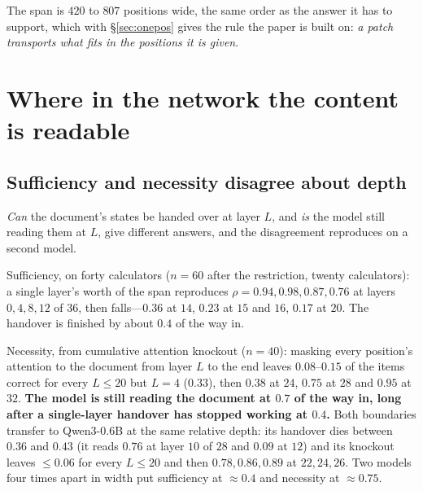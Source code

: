 \documentclass{article}
\begin{document}
\begin{table}[t]
\caption{The span battery on forty calculators. The restricted split---the
fifteen calculators a wrong document never rescues---is recomputed inside this
set, so no number is inherited from the ten-calculator version. Intervals are
bootstrapped over calculators. The last two rows are the instrument: writing the
receiver's own states back into it, and not patching at all.}
\label{tab:big40}
\centering
\small

\end{table}

The span is $420$ to $807$ positions wide, the same order as the answer it has
to support, which with \S\ref{sec:onepos} gives the rule the paper is built on:
\emph{a patch transports what fits in the positions it is given}.

\section{Where in the network the content is readable}
\label{sec:where}

\subsection{Sufficiency and necessity disagree about depth}
\label{sec:depth}

\emph{Can} the document's states be handed over at layer $L$, and \emph{is} the
model still reading them at $L$, give different answers, and the disagreement
reproduces on a second model.

Sufficiency, on forty calculators ($n=60$ after the restriction, twenty
calculators): a single layer's worth of the span reproduces
$\rho = 0.94, 0.98, 0.87, 0.76$ at layers $0, 4, 8, 12$ of $36$, then
falls---$0.36$ at $14$, $0.23$ at $15$ and $16$, $0.17$ at $20$. The handover is
finished by about $0.4$ of the way in.

Necessity, from cumulative attention knockout ($n=40$): masking every position's
attention to the document from layer $L$ to the end leaves $0.08$--$0.15$ of the
items correct for every $L \le 20$ but $L=4$ ($0.33$), then $0.38$ at $24$, $0.75$ at $28$ and
$0.95$ at $32$. \textbf{The model is still reading the document at $0.7$ of the
way in, long after a single-layer handover has stopped working at $0.4$.} Both
boundaries transfer to Qwen3-0.6B at the same relative depth: its handover dies
between $0.36$ and $0.43$ (it reads $0.76$ at layer $10$ of $28$ and $0.09$ at
$12$) and its knockout leaves $\le 0.06$ for every $L \le 20$ and then
$0.78, 0.86, 0.89$ at $22, 24, 26$. Two models four times apart in width put
sufficiency at $\approx 0.4$ and necessity at $\approx 0.75$.
\end{document}
